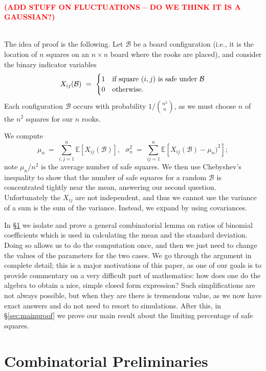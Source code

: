 \documentclass[12pt,reqno]{amsart}
\newcommand{\E}{\mathbb{E}}
\renewcommand{\E}{\mathbb{E}}
\numberwithin{equation}{section}
\theoremstyle{plain}
\newcommand\be{\begin{equation}}
\newcommand\ee{\end{equation}}
\newcommand{\ncr}[2]{{#1 \choose #2}}
\newcommand{\twocase}[5]{#1 \begin{cases} #2 & \text{{\rm #3}}\\ #4 &\text{{\rm #5}} \end{cases}}
\newcommand{\fix}[1]{\textcolor{red}{\textbf{\large (#1)\normalsize}}}
\begin{document}
\ \\

\fix{ADD STUFF ON FLUCTUATIONS -- DO WE THINK IT IS A GAUSSIAN?}

\ \\

The idea of proof is the following. Let $\mathcal{B}$ be a board configuration (i.e., it is the location of $n$ squares on an $n\times n$ board where the rooks are placed), and consider the binary indicator variables \be \twocase{X_{ij}(\mathcal{B}) \ = \ }{1}{if square $(i,j)$ is safe under $\mathcal{B}$}{0}{otherwise.} \ee Each configuration $\mathcal{B}$ occurs with probability $1/\ncr{n^2}{n}$, as we must choose $n$ of the $n^2$ squares for our $n$ rooks.

We compute \be \mu_n \ = \ \sum_{i,j=1}^n \E[X_{ij}(\mathcal{B})], \ \ \ \sigma_n^2 \ = \ \sum_{ij=1}^n \E[X_{ij}(\mathcal{B}) - \mu_n)^2]; \ee note $\mu_n/n^2$ is the average number of safe squares. We then use Chebyshev's inequality to show that the number of safe squares for a random $\mathcal{B}$ is concentrated tightly near the mean, answering our second question. Unfortunately the $X_{ij}$ are not independent, and thus we cannot use the variance of a sum is the sum of the variance. Instead, we expand by using covariances.

In \S\ref{sec:combprelim} we isolate and prove a general combinatorial lemma on ratios of binomial coefficients which is used in calculating the mean and the standard deviation. Doing so allows us to do the computation once, and then we just need to change the values of the parameters for the two cases. We go through the argument in complete detail; this is a major motivations of this paper, as one of our goals is to provide commentary on a very difficult part of mathematics: how does one do the algebra to obtain a nice, simple closed form expression? Such simplifications are not always possible, but when they are there is tremendous value, as we now have exact answers and do not need to resort to simulations. After this, in \S\ref{sec:mainproof} we prove our main result about the limiting percentage of safe squares.


\section{Combinatorial Preliminaries}\label{sec:combprelim}
\end{document}
